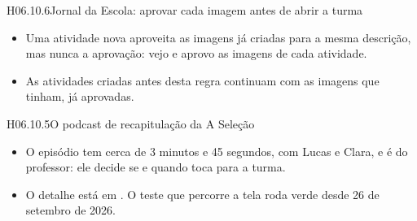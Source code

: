 \begin{historia}{H06.10.6}{Jornal da Escola: aprovar cada imagem antes de abrir a turma}{\parcial}
\begin{itemize}
  \item Uma atividade nova aproveita as imagens já criadas para a mesma
    descrição, mas nunca a aprovação: vejo e aprovo as imagens de cada
    atividade.
  \item As atividades criadas antes desta regra continuam com as imagens que
    tinham, já aprovadas.
\end{itemize}
\end{historia}

\begin{historia}{H06.10.5}{O podcast de recapitulação da A Seleção}{\parcial}
\aceite
\begin{itemize}
  \item O episódio tem cerca de 3 minutos e 45 segundos, com Lucas e Clara, e é
    do professor: ele decide se e quando toca para a turma.
  \item O detalhe está em . O teste que percorre a tela roda verde
    desde 26 de setembro de 2026.
\end{itemize}
\end{historia}

